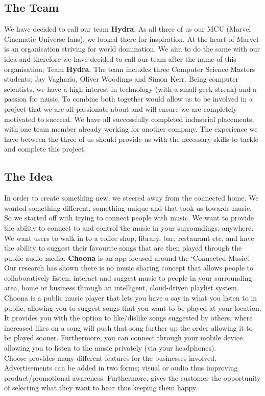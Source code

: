 \subsection{The Team}
We have decided to call our team \textbf{Hydra}.  As all three of us our MCU (Marvel Cinematic Universe fans), we looked there for inspiration.  At the heart of Marvel is an organisation striving for world domination.  We aim to do the same with our idea and therefore we have decided to call our team after the name of this organisation; Team \textbf{Hydra}.  The team includes three Computer Science Masters students; Jay Vagharia, Oliver Woodings and Simon Kerr.  Being computer scientists, we have a high interest in technology (with a small geek streak) and a passion for music.  To combine both together would allow us to be involved in a project that we are all passionate about and will ensure we are completely motivated to succeed.  We have all successfully completed industrial placements, with one team member already working for another company.  The experience we have between the three of us should provide us with the necessary skills to tackle and complete this project. 

\subsection{The Idea}
In order to create something new, we steered away from the connected home.  We wanted something different, something unique and that took us towards music.  So we started off with trying to connect people with music.  We want to provide the ability to connect to and control the music in your surroundings, anywhere.  We want users to walk in to a coffee shop, library, bar, restaurant etc. and have the ability to suggest their favourite songs that are then played through the public audio media.  \textbf{Choona} is an app focused around the `Connected Music'.  Our research has shown there is no music sharing concept that allows people to collaboratively listen, interact and suggest music to people in your surrounding area, home or business through an intelligent, cloud-driven playlist system.  \\
Choona is a public music player that lets you have a say in what you listen to in public, allowing you to suggest songs that you want to be played at your location.  It provides you with the option to like/dislike songs suggested by others, where increased likes on a song will push that song further up the order allowing it to be played sooner.  Furthermore, you can connect through your mobile device allowing you to listen to the music privately (via your headphones).  \\
Choose provides many different features for the businesses involved.  Advertisements can be added in two forms; visual or audio thus improving product/promotional awareness.  Furthermore, gives the  customer the opportunity of selecting what they want to hear thus keeping them happy.  